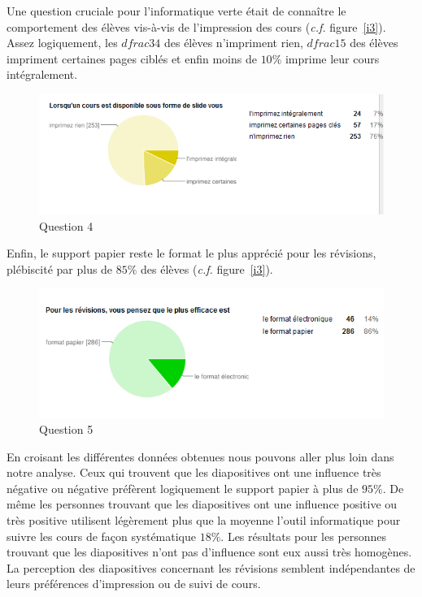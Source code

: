 \documentclass[a4paper,11pt,french]{article}
\begin{document}
Une question cruciale pour l’informatique verte était de connaître le comportement des élèves vis-à-vis de l’impression des cours (\textit{c.f.} figure~\vref{i3}). Assez logiquement, les $dfrac{3}{4}$ des élèves n’impriment rien, $dfrac{1}{5}$ des élèves impriment certaines pages ciblés et enfin moins de $10\%$ imprime leur cours intégralement.

\begin{figure}[h!]
\includegraphics[width=\textwidth]{i4.PNG}
\caption{Question 4}
\label{i4}
\end{figure}


Enfin, le support papier reste le format le plus apprécié pour les révisions, plébiscité par plus de $85\%$ des élèves (\textit{c.f.} figure~\vref{i3}).


\begin{figure}[h!]
\includegraphics[width=\textwidth]{i5.PNG}
\caption{Question 5}
\label{i5}
\end{figure}


En croisant les différentes données obtenues nous pouvons aller plus loin dans notre analyse. Ceux qui trouvent que les diapositives ont une influence très négative ou négative préfèrent logiquement le support papier à plus de $95\%$. De même les personnes trouvant que les diapositives ont une influence positive ou très positive utilisent légèrement plus que la moyenne l’outil informatique pour suivre les cours de façon systématique $18\%$. Les résultats pour les personnes trouvant que les diapositives n’ont pas d’influence sont eux aussi très homogènes. La perception des diapositives concernant les révisions semblent indépendantes de leurs préférences d’impression ou de suivi de cours.\\
\end{document}
